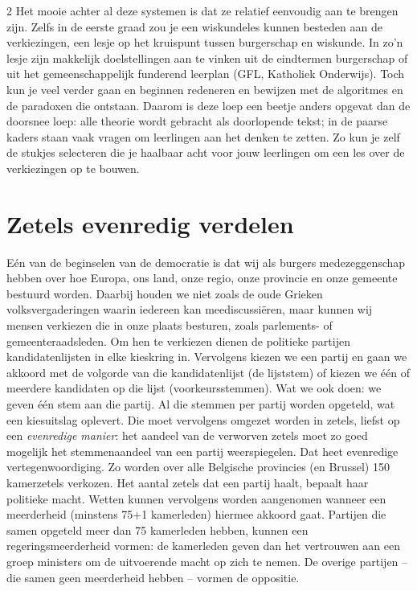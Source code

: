 \begin{multicols}{2}
Het mooie achter al deze systemen is dat ze relatief eenvoudig aan te brengen zijn. Zelfs in de eerste graad zou je een wiskundeles kunnen besteden aan de verkiezingen, een lesje op het kruispunt tussen burgerschap en wiskunde. In zo'n lesje zijn makkelijk doelstellingen aan te vinken uit de eindtermen burgerschap of uit het gemeenschappelijk funderend leerplan (GFL, Katholiek Onderwijs). Toch kun je veel verder gaan en beginnen redeneren en bewijzen met de algoritmes en de paradoxen die ontstaan. Daarom is deze loep een beetje anders opgevat dan de doorsnee loep: alle theorie wordt gebracht als doorlopende tekst; in de paarse kaders staan vaak vragen om leerlingen aan het denken te zetten. Zo kun je zelf de stukjes selecteren die je haalbaar acht voor jouw leerlingen om een les over de verkiezingen op te bouwen.


\section{Zetels evenredig verdelen}
Eén van de beginselen van de democratie is dat wij als burgers medezeggenschap hebben over hoe Europa, ons land, onze regio, onze provincie en onze gemeente bestuurd worden. Daarbij houden we niet zoals de oude Grieken volksvergaderingen waarin iedereen kan meediscussiëren, maar kunnen wij mensen verkiezen die in onze plaats besturen, zoals parlements- of gemeenteraadsleden.
Om hen te verkiezen dienen de politieke partijen kandidatenlijsten in elke kieskring in. Vervolgens kiezen we een partij en gaan we akkoord met de volgorde van die kandidatenlijst (de lijststem) of kiezen we één of meerdere kandidaten op die lijst (voorkeursstemmen). Wat we ook doen: we geven één stem aan die partij. Al die stemmen per partij worden opgeteld, wat een kiesuitslag oplevert. Die moet vervolgens omgezet worden in zetels, liefst op een \emph{evenredige manier}: het aandeel van de verworven zetels moet zo goed mogelijk het stemmenaandeel van een partij weerspiegelen. Dat heet evenredige vertegenwoordiging. Zo worden over alle Belgische provincies (en Brussel) 150 kamerzetels verkozen. Het aantal zetels dat een partij haalt, bepaalt haar politieke macht. Wetten kunnen vervolgens worden aangenomen wanneer een meerderheid (minstens 75+1 kamerleden) hiermee akkoord gaat. Partijen die samen opgeteld meer dan 75 kamerleden hebben, kunnen een regeringsmeerderheid vormen: de kamerleden geven dan het vertrouwen aan een groep ministers om de uitvoerende macht op zich te nemen. De overige partijen -- die samen geen meerderheid hebben -- vormen de oppositie. 


\end{multicols}
